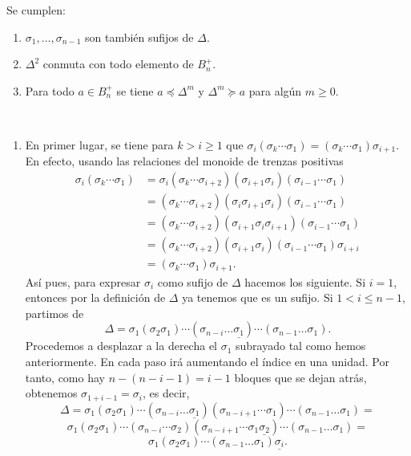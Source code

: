 \documentclass[TFG.tex]{subfiles}
\begin{document}
\begin{prop} Se cumplen:
\begin{enumerate}
\item $\sigma_1,\dots,\sigma_{n-1}$ son también sufijos de $\Delta$.
\item $\Delta^2$ conmuta con todo elemento de $B_n^+$.
\item Para todo $a\in B_n^+$ se tiene $a\preccurlyeq\Delta^m$ y $\Delta^m\succcurlyeq a$ para algún $m\geq 0$.
\end{enumerate}
\end{prop}
\begin{dem}\
\begin{enumerate}
\item En primer lugar, se tiene para $k>i\geq 1$ que $\sigma_i(\sigma_k\cdots\sigma_1)=(\sigma_k\cdots\sigma_1)\sigma_{i+1}$. En efecto, usando las relaciones del monoide de trenzas positivas
\begin{align*}
\sigma_i(\sigma_k\cdots\sigma_1)&=\sigma_i(\sigma_k\cdots\sigma_{i+2})(\sigma_{i+1}\sigma_i)(\sigma_{i-1}\cdots\sigma_1)\\
&=(\sigma_k\cdots\sigma_{i+2})(\sigma_i\sigma_{i+1}\sigma_i)(\sigma_{i-1}\cdots\sigma_1)\\
&=(\sigma_k\cdots\sigma_{i+2})(\sigma_{i+1}\sigma_i\sigma_{i+1})(\sigma_{i-1}\cdots\sigma_1)\\
&=(\sigma_k\cdots\sigma_{i+2})(\sigma_{i+1}\sigma_i)(\sigma_{i-1}\cdots\sigma_1)\sigma_{i+i}\\
&=(\sigma_k\cdots\sigma_1)\sigma_{i+1}.
\end{align*}
Así pues, para expresar $\sigma_i$ como sufijo de $\Delta$ hacemos los siguiente. Si $i=1$, entonces por la definición de $\Delta$ ya tenemos que es un sufijo. Si $1<i\leq n-1$, partimos de
\[
\Delta=\sigma_1(\sigma_2\sigma_1)\cdots(\sigma_{n-i}\dots\underline{\sigma_1})\cdots(\sigma_{n-1}\dots\sigma_1).
\]
Procedemos a desplazar a la derecha el $\sigma_1$ subrayado tal como hemos anteriormente. En cada paso irá aumentando el índice en una unidad. Por tanto, como hay $n-(n-i-1)=i-1$ bloques que se dejan atrás, obtenemos $\sigma_{1+i-1}=\sigma_i$, es decir,
\[
\Delta=\sigma_1(\sigma_2\sigma_1)\cdots(\sigma_{n-i}\dots\underline{\sigma_1})(\sigma_{n-i+1}\cdots\sigma_1)\cdots(\sigma_{n-1}\dots\sigma_1)=
\]
\[
\sigma_1(\sigma_2\sigma_1)\cdots(\sigma_{n-i}\cdots\sigma_2)(\sigma_{n-i+1}\cdots\sigma_1\underline{\sigma_2})\cdots(\sigma_{n-1}\dots\sigma_1)=
\]
\[
\sigma_1(\sigma_2\sigma_1)\cdots(\sigma_{n-1}\dots\sigma_1)\underline{\sigma_i}.
\]


\end{enumerate}
\end{dem}
\end{document}
